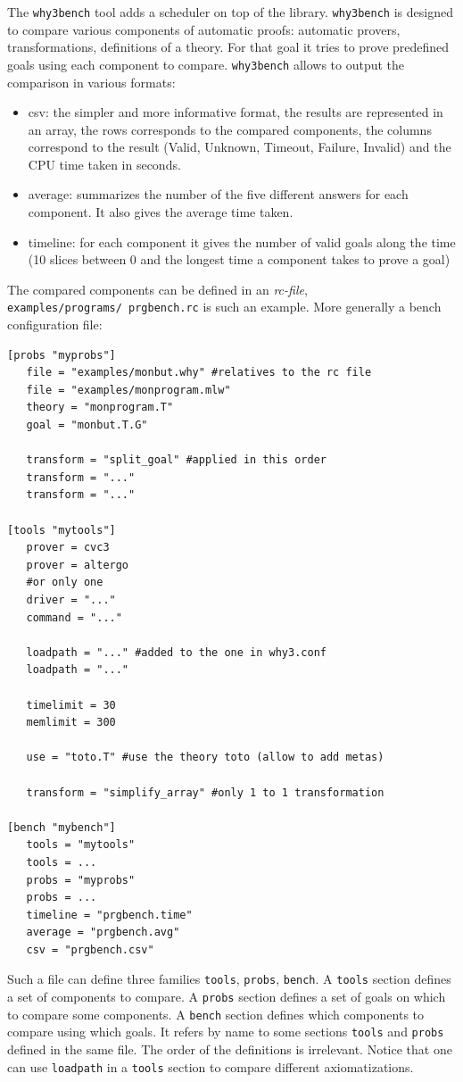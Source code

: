The \texttt{why3bench} tool adds a scheduler on top of the \why
library. \texttt{why3bench} is designed to compare various components
of automatic proofs: automatic provers, transformations, definitions
of a theory. For that goal it tries to prove predefined goals using
each component to compare. \texttt{why3bench} allows to output the
comparison in various formats:
\begin{itemize}
\item csv: the simpler and more informative format, the results are
  represented in an array, the rows corresponds to the
  compared components, the columns correspond to the result
  (Valid, Unknown, Timeout, Failure, Invalid) and the CPU time taken in seconds.
\item average: summarizes the number of the five different answers
  for each component. It also gives the average time taken.
\item timeline: for each component it gives the number of valid goals
  along the time (10 slices between 0 and the longest time a component
  takes to prove a goal)
\end{itemize}

The compared components can be defined in an \emph{rc-file},
\texttt{examples/programs/\ prgbench.rc} is such an example. More
generally a bench configuration file:
\begin{verbatim}
[probs "myprobs"]
   file = "examples/monbut.why" #relatives to the rc file
   file = "examples/monprogram.mlw"
   theory = "monprogram.T"
   goal = "monbut.T.G"

   transform = "split_goal" #applied in this order
   transform = "..."
   transform = "..."

[tools "mytools"]
   prover = cvc3
   prover = altergo
   #or only one
   driver = "..."
   command = "..."

   loadpath = "..." #added to the one in why3.conf
   loadpath = "..."

   timelimit = 30
   memlimit = 300

   use = "toto.T" #use the theory toto (allow to add metas)

   transform = "simplify_array" #only 1 to 1 transformation

[bench "mybench"]
   tools = "mytools"
   tools = ...
   probs = "myprobs"
   probs = ...
   timeline = "prgbench.time"
   average = "prgbench.avg"
   csv = "prgbench.csv"
\end{verbatim}

Such a file can define three families \texttt{tools}, \texttt{probs},
\texttt{bench}. A \texttt{tools} section defines a set of components to
compare. A \texttt{probs} section defines a set of goals on which to compare some
components. A \texttt{bench} section defines which components to
compare using which goals. It refers by name to some sections
\texttt{tools} and \texttt{probs} defined in the same file. The order
of the definitions is irrelevant. Notice that one can use
\texttt{loadpath} in a \texttt{tools} section to compare different
axiomatizations.

